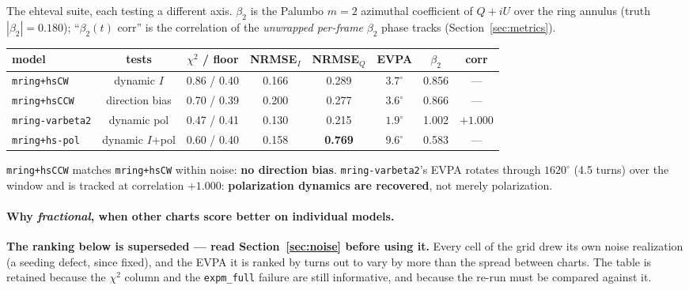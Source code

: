 \documentclass[11pt]{article}
\begin{document}
The ehteval suite, each testing a different axis. $\beta_2$ is the Palumbo $m\!=\!2$
azimuthal coefficient of $Q+iU$ over the ring annulus (truth $|\beta_2|=0.180$);
``$\beta_2(t)$ corr'' is the correlation of the \emph{unwrapped per-frame} $\beta_2$
phase tracks (Section~\ref{sec:metrics}).

\begin{center}
\begin{tabular}{@{}lccccccc@{}}
\toprule
model & tests & $\chi^2$ / floor & NRMSE$_I$ & NRMSE$_Q$ & EVPA & $\beta_2$ & corr \\
\midrule
\texttt{mring+hsCW}   & dynamic $I$      & 0.86 / 0.40 & 0.166 & 0.289 & $3.7^\circ$ & 0.856 & --- \\
\texttt{mring+hsCCW}  & direction bias   & 0.70 / 0.39 & 0.200 & 0.277 & $3.6^\circ$ & 0.866 & --- \\
\texttt{mring-varbeta2} & dynamic pol    & 0.47 / 0.41 & 0.130 & 0.215 & $1.9^\circ$ & 1.002 & $+1.000$ \\
\texttt{mring+hs-pol} & dynamic $I$+pol  & 0.60 / 0.40 & 0.158 & \textbf{0.769} & $9.6^\circ$ & 0.583 & --- \\
\bottomrule
\end{tabular}
\end{center}

\texttt{mring+hsCCW} matches \texttt{mring+hsCW} within noise: \textbf{no direction
bias}. \texttt{mring-varbeta2}'s EVPA rotates through $1620^\circ$ (4.5 turns) over the
window and is tracked at correlation $+1.000$: \textbf{polarization dynamics are
recovered}, not merely polarization.

\paragraph{Why \emph{fractional}, when other charts score better on individual models.}
\textbf{The ranking below is superseded --- read
Section~\ref{sec:noise} before using it.} Every cell of the grid drew its own noise
realization (a seeding defect, since fixed), and the EVPA it is ranked by turns out to
vary by more than the spread between charts. The table is retained because the
$\chi^2$ column and the \texttt{expm\_full} failure are still informative, and because
the re-run must be compared against it.
\end{document}
